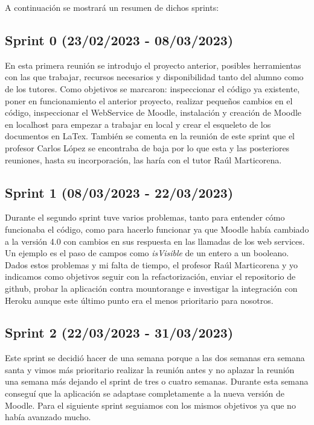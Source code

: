 A continuación se mostrará un resumen de dichos sprints:

\subsection{Sprint 0 (23/02/2023 - 08/03/2023)}
	En esta primera reunión se introdujo el proyecto anterior, posibles herramientas con las que trabajar, recursos necesarios y disponibilidad tanto del alumno como de los tutores. Como objetivos se marcaron: inspeccionar el código ya existente, poner en funcionamiento el anterior proyecto, realizar pequeños cambios en el código, inspeccionar el WebService de Moodle, instalación y creación de Moodle en localhost para empezar a trabajar en local y crear el esqueleto de los documentos en LaTex.
    También se comenta en la reunión de este sprint que el profesor Carlos López se encontraba de baja por lo que esta y las posteriores reuniones, hasta su incorporación, las haría con el tutor Raúl Marticorena.

\subsection{Sprint 1 (08/03/2023 - 22/03/2023)}
	Durante el segundo sprint tuve varios problemas, tanto para entender cómo funcionaba el código, como para hacerlo funcionar ya que Moodle había cambiado a la versión 4.0 con cambios en sus respuesta en las llamadas de los web services. Un ejemplo es el paso de campos como \textit{isVisible} de un entero a un booleano. Dados estos problemas y mi falta de tiempo, el profesor Raúl Marticorena y yo indicamos como objetivos seguir con la refactorización, enviar el repositorio de github, probar la aplicación contra mountorange e investigar la integración con Heroku aunque este último punto era el menos prioritario para nosotros.

\subsection{Sprint 2 (22/03/2023 - 31/03/2023)}
	Este sprint se decidió hacer de una semana porque a las dos semanas era semana santa y vimos más prioritario realizar la reunión antes y no aplazar la reunión una semana más dejando el sprint de tres o cuatro semanas. Durante esta semana conseguí que la aplicación se adaptase completamente a la nueva versión de Moodle. Para el siguiente sprint seguiamos con los mismos objetivos ya que no había avanzado mucho.

